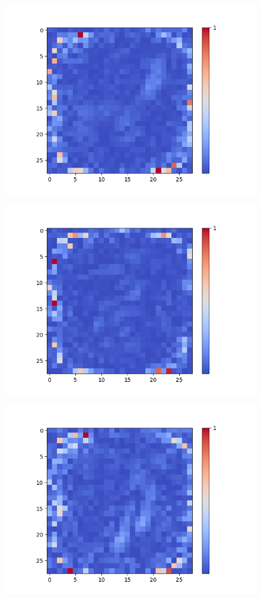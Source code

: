 \begin{figure}[H]
\begin{minipage}[b]{0.19\textwidth}
		\includegraphics[width=\textwidth]{Linear-AE/Feature-11.png}
		\label{}
	\end{minipage}
	\begin{minipage}[b]{0.19\textwidth}
		\includegraphics[width=\textwidth]{Linear-AE/Feature-15.png}
		\label{}
	\end{minipage}
	\begin{minipage}[b]{0.19\textwidth}
		\includegraphics[width=\textwidth]{Linear-AE/Feature-18.png}

\end{minipage}
\end{figure}
